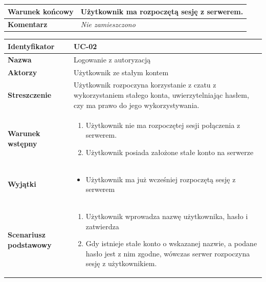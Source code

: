 \documentclass[11pt,oneside,a4paper,titlepage,onecolumn]{article}
\begin{document}
{\begin{tabular}{ | l | l | }
	\hline
		\parbox[t]{4cm}{\textbf{Warunek końcowy}} & \parbox[t]{11cm}{
			Użytkownik ma rozpoczętą sesję z serwerem.
		}
		\\
		
	\hline
		\parbox[t]{4cm}{\textbf{Komentarz}} & \parbox[t]{11cm}{
			\textit{Nie zamieszczono}
		}
		\\

	\hline
\end{tabular}

\vspace{2em}

\begin{tabular}{ | l | l | }
	\hline
		\textbf{Identyfikator} & 
		UC-02
		\\
		
	\hline
		\textbf{Nazwa} & 
		Logowanie z autoryzacją
		\\
		
	\hline
		\textbf{Aktorzy} & \parbox[t]{11cm}{
			Użytkownik ze stałym kontem
		}\\
		 
	\hline
		\parbox[t]{4cm}{\textbf{Streszczenie}} & \parbox[t]{11cm}{
			Użytkownik rozpoczyna korzystanie z czatu z wykorzystaniem
			stałego konta, uwierzytelniając hasłem, czy ma prawo do
			jego wykorzystywania.
			
		}\\
		
	\hline
		\parbox[t]{4cm}{\textbf{Warunek wstępny}} & \parbox[t]{11cm}{
			\begin{enumerate}
				\item Użytkownik nie ma rozpoczętej sesji połączenia 
				z serwerem.
				\item Użytkownik posiada założone stałe konto na serwerze
			\end{enumerate}
			
		}
		\\
		
	\hline
		\parbox[t]{4cm}{\textbf{Wyjątki}} & \parbox[t]{11cm}{
			\begin{itemize}
				\item Użytkownik ma już wcześniej rozpoczętą
				 sesję z serwerem
			\end{itemize}
			
		}
		\\

	\hline
		\parbox[t]{4cm}{\textbf{Scenariusz podstawowy}} & \parbox[t]{11cm}{
			\begin{enumerate}
				\item Użytkownik wprowadza nazwę użytkownika, hasło 
				i zatwierdza
				\item Gdy istnieje stałe konto o wskazanej nazwie, a
				podane hasło jest z nim zgodne, wówczas serwer rozpoczyna
				sesję z użytkownikiem.
			\end{enumerate}
		}
		\\
		

\end{tabular}}
\end{document}
